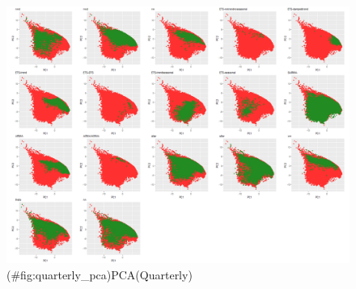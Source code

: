 \documentclass[11pt,a4paper,]{article}
\theoremstyle{definition}
\theoremstyle{definition}
\theoremstyle{definition}
\theoremstyle{remark}
\begin{document}
\begin{figure}
\centering
\includegraphics{figures/quarterly_pca-1.png}
\caption{(\#fig:quarterly\_pca)PCA(Quarterly)}
\end{figure}

\newpage

\printbibliography[title=References]
\end{document}
